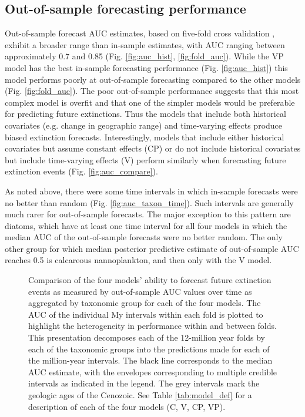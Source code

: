 \documentclass[12pt,letterpaper]{article}
\begin{document}
\begin{refsection}
\subsection{Out-of-sample forecasting performance}

Out-of-sample forecast AUC estimates, based on five-fold cross validation \citep{Arlot2010,Bergmeir2016}, exhibit a broader range than in-sample estimates, with AUC ranging between approximately 0.7 and 0.85 (Fig. \ref{fig:auc_hist}, \ref{fig:fold_auc}). While the VP model has the best in-sample forecasting performance (Fig. \ref{fig:auc_hist}) this model performs poorly at out-of-sample forecasting compared to the other models (Fig. \ref{fig:fold_auc}). The poor out-of-sample performance suggests that this most complex model is overfit and that one of the simpler models would be preferable for predicting future extinctions. Thus the models that include both historical covariates (e.g. change in geographic range) and time-varying effects produce biased extinction forecasts. Interestingly, models that include either historical covariates but assume constant effects (CP) or do not include historical covariates but include time-varying effects (V) perform similarly when forecasting future extinction events (Fig. \ref{fig:auc_compare}). 


As noted above, there were some time intervals in which in-sample forecasts were no better than random (Fig. \ref{fig:auc_taxon_time}). Such intervals are generally much rarer for out-of-sample forecasts. The major exception to this pattern are diatoms, which have at least one time interval for all four models in which the median AUC of the out-of-sample forecasts were no better random. The only other group for which median posterior predictive estimate of out-of-sample AUC reaches 0.5 is calcareous nannoplankton, and then only with the V model.
\begin{figure}[ht]
 \centering
 \caption{Comparison of the four models' ability to forecast future extinction events as measured by out-of-sample AUC values over time as aggregated by taxonomic group for each of the four models. The AUC of the individual My intervals within each fold is plotted to highlight the heterogeneity in performance within and between folds. This presentation decomposes each of the 12-million year folds by each of the taxonomic groups into the predictions made for each of the million-year intervals. The black line corresponds to the median AUC estimate, with the envelopes corresponding to multiple credible intervals as indicated in the legend. The grey intervals mark the geologic ages of the Cenozoic. See Table \ref{tab:model_def} for a description of each of the four models (C, V, CP, VP).}
 \label{fig:fold_auc_taxon_time}
\end{figure}


\end{refsection}
\end{document}
